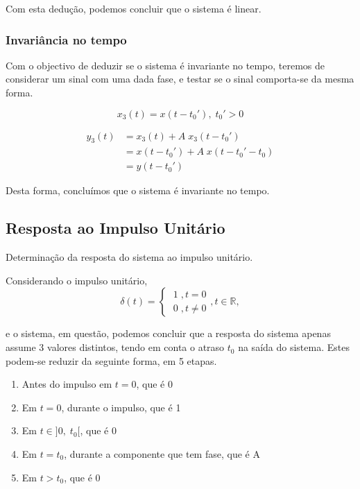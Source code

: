 \documentclass[12pt,a4paper]{article}
\begin{document}
Com esta dedução, podemos concluir que o sistema é linear.

\newpage
\subsubsection{Invariância no tempo}

Com o objectivo de deduzir se o sistema é invariante no tempo, teremos de
considerar um sinal com uma dada fase, e testar se o sinal comporta-se da 
mesma forma.

\begin{equation}
	x_3(t) = x(t - t_0'), \; t_0' > 0
\end{equation}

\begin{equation}
	\begin{split}	
		y_3(t) &= x_3(t) + A \; x_3(t - t_0') \\
		&= x(t - t_0') + A \; x(t - t_0' - t_0) \\
		&= y(t - t_0')
	\end{split}
\end{equation}

Desta forma, concluímos que o sistema é invariante no tempo.

\newpage
\subsection{Resposta ao Impulso Unitário}

Determinação da resposta do sistema ao impulso unitário.

Considerando o impulso unitário,
\begin{equation}
	\delta (t) =
	\begin{cases}
		\; 1 \;, t = 0 \\
		\; 0 \;, t \neq 0
	\end{cases}, t \in \mathbb{R},
\end{equation}

e o sistema, em questão, podemos concluir que a resposta do sistema apenas
assume 3 valores distintos, tendo em conta o atraso $t_0$ na saída do sistema.
Estes podem-se reduzir da seguinte forma, em 5 etapas.

\begin{enumerate}
	\item Antes do impulso em $t = 0$, que é 0
	\item Em $t=0$, durante o impulso, que é 1
	\item Em $t \in ]0, \; t_0[$, que é 0	
	\item Em $t = t_0$, durante a componente que tem fase, que é A
	\item Em $t > t_0$, que é 0
\end{enumerate}
\end{document}
